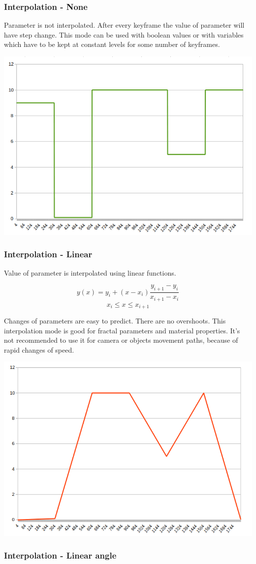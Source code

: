 \subsubsection{Interpolation - None}\label{interpolation-none}

Parameter is not interpolated. After every keyframe the value of parameter will
have step change. This mode can be used with boolean values or with variables
which have to be kept at constant levels for some number of keyframes.

\includegraphics[width=0.5\linewidth]{img/manual/media/interpolation_none}

\subsubsection{Interpolation - Linear}\label{interpolation-linear}

Value of parameter is interpolated using linear functions.

\[ y(x) = y_i + (x - x_i) \frac{y_{i+1} - y_i}{x_{i+1} - x_i}\] \[x_i  \leq x
\leq x_{i+1}\]

Changes of parameters are easy to predict. There are no overshoots. This
interpolation mode is good for fractal parameters and material properties. It's
not recommended to use it for camera or objects movement paths, because of rapid
changes of speed.

\includegraphics[width=0.5\linewidth]{img/manual/media/interpolation_linear.png}

\subsubsection{Interpolation - Linear angle}\label{interpolation-linear-angle}

